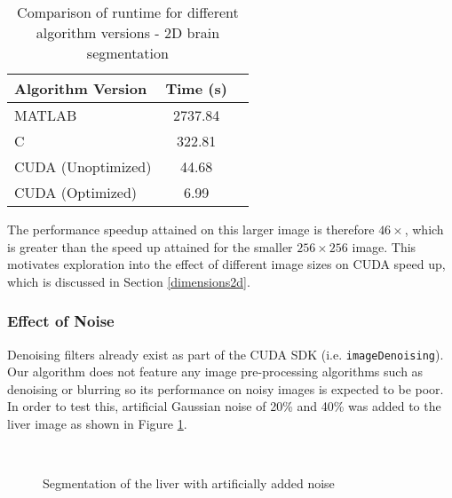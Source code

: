 \begin{table}[h]
\centering
\begin{tabular}{ | l | c | r | }
	\hline
	Algorithm Version  & Time (s)\\ \hline
  MATLAB 						 & 2737.84 \\
  C 								 & 322.81 \\
  CUDA (Unoptimized) & 44.68 \\
  CUDA (Optimized)   & 6.99  \\
  \hline
\end{tabular}\caption{Comparison of runtime for different algorithm versions - 2D brain segmentation}
\label{braintime}
\end{table}

The performance speedup attained on this larger image is therefore $46 \times$, which is greater than the speed up attained for the smaller $256 \times 256$ image. This motivates exploration into the effect of different image sizes on CUDA speed up, which is discussed in Section \ref{dimensions2d}. 

\subsubsection{Effect of Noise}

Denoising filters already exist as part of the CUDA SDK (i.e. \texttt{imageDenoising}). Our algorithm does not feature any image pre-processing algorithms such as denoising or blurring so its performance on noisy images is expected to be poor. In order to test this, artificial Gaussian noise of 20\% and 40\% was added to the liver image as shown in Figure \ref{fig:livernoise}. 

\begin{figure}[h]
  \begin{center}
    \\
  \end{center}
  \caption{Segmentation of the liver with artificially added noise}
  \label{fig:livernoise}
\end{figure}

